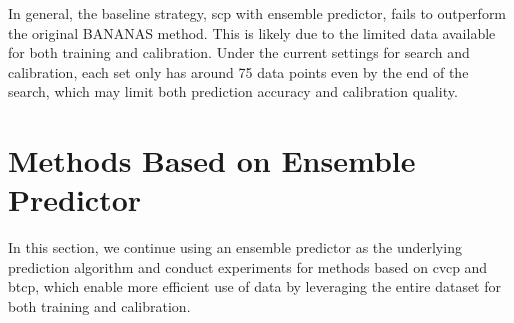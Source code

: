 \documentclass[a4paper,oneside,bibliography=totoc]{scrbook}
\begin{document}
In general, the baseline strategy, \gls{scp} with ensemble predictor, fails to outperform the original BANANAS method. This is likely due to the limited data available for both training and calibration. Under the current settings for search and calibration, each set only has around 75 data points even by the end of the search, which may limit both prediction accuracy and calibration quality. 

\section{Methods Based on Ensemble Predictor}
In this section, we continue using an ensemble predictor as the underlying prediction algorithm and conduct experiments for methods based on \gls{cvcp} and \gls{btcp}, which enable more efficient use of data by leveraging the entire dataset for both training and calibration.
\end{document}
